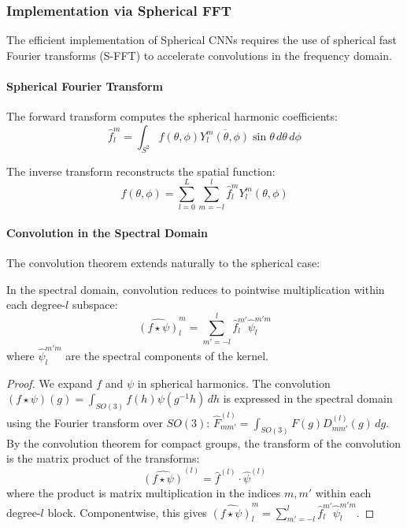 \subsubsection{Implementation via Spherical FFT}

The efficient implementation of Spherical CNNs requires the use of spherical fast Fourier transforms (S-FFT) to accelerate convolutions in the frequency domain.

\paragraph{Spherical Fourier Transform}

\begin{definition}
The forward transform computes the spherical harmonic coefficients:
\begin{equation}
\hat{f}_l^m = \int_{S^2} f(\theta, \phi) \overline{Y_l^m(\theta, \phi)} \sin \theta \, d\theta \, d\phi
\end{equation}
\end{definition}

\begin{definition}
The inverse transform reconstructs the spatial function:
\begin{equation}
f(\theta, \phi) = \sum_{l=0}^{L} \sum_{m=-l}^{l} \hat{f}_l^m Y_l^m(\theta, \phi)
\end{equation}
\end{definition}

\paragraph{Convolution in the Spectral Domain}

The convolution theorem extends naturally to the spherical case:

\begin{theorem}
In the spectral domain, convolution reduces to pointwise multiplication within each degree-$l$ subspace:
\begin{equation}
\widehat{(f \star \psi)}_l^m = \sum_{m'=-l}^{l} \hat{f}_l^{m'} \hat{\psi}_l^{m'm}
\end{equation}
where $\hat{\psi}_l^{m'm}$ are the spectral components of the kernel.
\end{theorem}

\begin{proof}
We expand $f$ and $\psi$ in spherical harmonics. The convolution $(f \star \psi)(g) = \int_{SO(3)} f(h) \psi(g^{-1}h) \, dh$ is expressed in the spectral domain using the Fourier transform over $SO(3)$: $\hat{F}^{(l)}_{mm'} = \int_{SO(3)} F(g) D^{(l)}_{mm'}(g) \, dg$. By the convolution theorem for compact groups, the transform of the convolution is the matrix product of the transforms:
\[
\widehat{(f \star \psi)}^{(l)} = \hat{f}^{(l)} \cdot \hat{\psi}^{(l)}
\]
where the product is matrix multiplication in the indices $m, m'$ within each degree-$l$ block. Componentwise, this gives $\widehat{(f \star \psi)}_l^m = \sum_{m'=-l}^{l} \hat{f}_l^{m'} \hat{\psi}_l^{m'm}$.
\end{proof}

